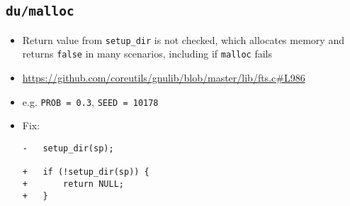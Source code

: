 \subsection{\texttt{du/malloc}}
\begin{itemize}
\item Return value from \texttt{setup\_dir} is not checked, which allocates memory and returns \texttt{false} in many scenarios, including if \texttt{malloc} fails
\item \href{https://github.com/coreutils/gnulib/blob/master/lib/fts.c\#L986}{https://github.com/coreutils/gnulib/blob/master/lib/fts.c\#L986}
\item e.g. \texttt{PROB = 0.3}, \texttt{SEED = 10178}
\item Fix:
\begin{lstlisting}
-	setup_dir(sp);

+	if (!setup_dir(sp)) {
+		return NULL;
+	}
\end{lstlisting}
\end{itemize}
